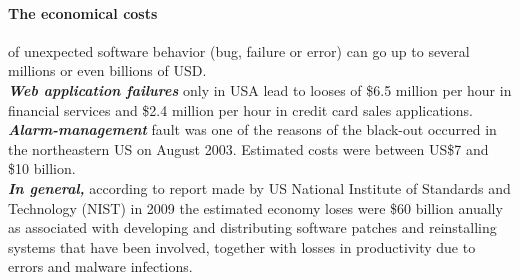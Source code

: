 
\paragraph{The economical costs} of unexpected software behavior (bug, failure or error) can go up to several millions or even billions of USD. \\
\textit{\textbf{Web application failures} }only in USA lead to looses of \$6.5 million per hour in financial services and \$2.4 million per hour in credit card sales applications\cite{Lecture1}. \\
\textit{\textbf{Alarm-management}} fault was one of the reasons of the black-out occurred in the northeastern US on August 2003. Estimated costs were between US\$7 and \$10 billion.\cite{costOfErrors}\\
\textit{\textbf{In general,}} according to report made by US National Institute of Standards and Technology (NIST) in 2009 the estimated economy loses  were \$60 billion anually as associated with developing and distributing software patches and reinstalling systems that have been involved, together with losses in productivity due to errors and malware infections\cite{costOfErrors}.\\



